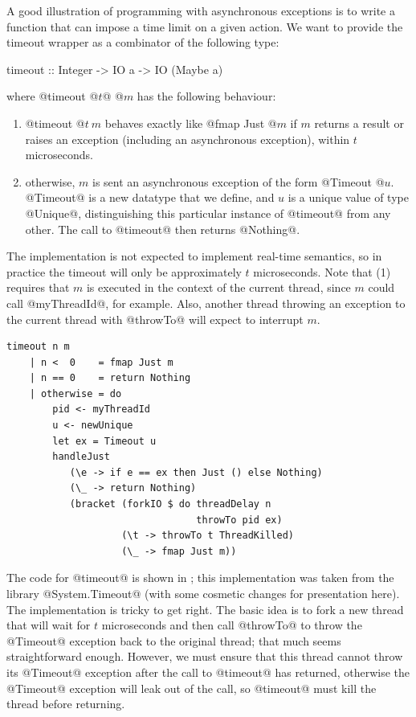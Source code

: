 
A good illustration of programming with asynchronous exceptions is to
write a function that can impose a time limit on a given action.  We
want to provide the timeout wrapper as a combinator of the following
type:

\begin{haskell}
timeout :: Integer -> IO a -> IO (Maybe a)
\end{haskell}

\noindent where @timeout @$t$@ @$m$ has the following behaviour:

\begin{enumerate}
\item @timeout @$t~m$ behaves exactly like @fmap Just @$m$ if $m$ returns a
  result or raises an exception (including an asynchronous exception),
  within $t$ microseconds.
\item otherwise, $m$ is sent an asynchronous exception of the form
  @Timeout @$u$.  @Timeout@ is a new datatype that we define, and $u$
  is a unique value of type @Unique@, distinguishing this particular
  instance of @timeout@ from any other.  The call to @timeout@ then
  returns @Nothing@.
\end{enumerate}

The implementation is not expected to implement real-time semantics,
so in practice the timeout will only be approximately $t$ microseconds.
Note that (1) requires that $m$ is executed in the context of the
current thread, since $m$ could call @myThreadId@, for example.  Also,
another thread throwing an exception to the current thread with
@throwTo@ will expect to interrupt $m$.

\begin{lstlisting}[float,label=lst:timeout,caption=implementation of \texttt{timeout},language=HaskellUlisses,style=numbers]
timeout n m
    | n <  0    = fmap Just m
    | n == 0    = return Nothing
    | otherwise = do
        pid <- myThreadId
        u <- newUnique
        let ex = Timeout u
        handleJust
           (\e -> if e == ex then Just () else Nothing)
           (\_ -> return Nothing)
           (bracket (forkIO $ do threadDelay n
                                 throwTo pid ex)
                    (\t -> throwTo t ThreadKilled)
                    (\_ -> fmap Just m))
\end{lstlisting}

The code for @timeout@ is shown in ; this
implementation was taken from the library @System.Timeout@ (with some
cosmetic changes for presentation here).  The implementation is tricky
to get right.  The basic idea is to fork a new thread that will wait
for $t$ microseconds and then call @throwTo@ to throw the @Timeout@
exception back to the original thread; that much seems straightforward
enough.  However, we must ensure that this thread cannot throw its
@Timeout@ exception after the call to @timeout@ has returned,
otherwise the @Timeout@ exception will leak out of the call, so
@timeout@ must kill the thread before returning.

